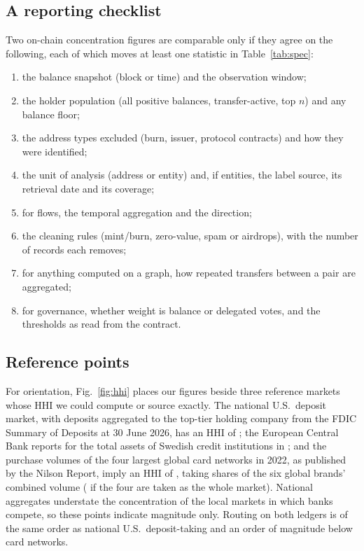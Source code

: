\subsection{A reporting checklist}
\label{sec:checklist}
Two on-chain concentration figures are comparable only if they agree on the
following, each of which moves at least one statistic in
Table~\ref{tab:spec}:
\begin{enumerate}
  \item the balance snapshot (block or time) and the observation window;
  \item the holder population (all positive balances, transfer-active, top
  $n$) and any balance floor;
  \item the address types excluded (burn, issuer, protocol contracts) and how
  they were identified;
  \item the unit of analysis (address or entity) and, if entities, the label
  source, its retrieval date and its coverage;
  \item for flows, the temporal aggregation and the direction;
  \item the cleaning rules (mint/burn, zero-value, spam or airdrops), with
  the number of records each removes;
  \item for anything computed on a graph, how repeated transfers between a
  pair are aggregated;
  \item for governance, whether weight is balance or delegated votes, and the
  thresholds as read from the contract.
\end{enumerate}

\subsection{Reference points}
\label{sec:benchmarks}
For orientation, Fig.~\ref{fig:hhi} places our figures beside three
reference markets whose HHI we could compute or source exactly. The national
U.S.\ deposit market, with deposits aggregated to the top-tier holding company
from the FDIC Summary of Deposits at 30 June 2026, has an HHI of
 \cite{fdic2026sod}; the European Central Bank reports
 for the total assets of Swedish credit institutions in
 \cite{ecb2026ssi}; and the purchase volumes of the four
largest global card networks in 2022, as published by the Nilson Report,
imply an HHI of  \cite{nilson2023issue1241}, taking shares of
the six global brands' combined volume ( if the four are
taken as the whole market). National
aggregates understate the concentration of the local markets in which banks
compete, so these points indicate magnitude only. Routing on both ledgers is
of the same order as national U.S.\ deposit-taking and an order of magnitude
below card networks.


